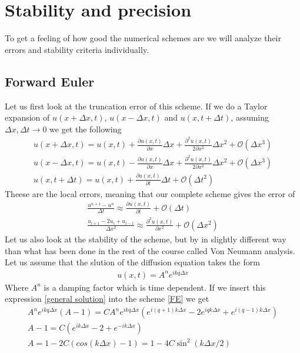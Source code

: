 \documentclass[a4paper,english, 10pt, twoside]{article}
\begin{document}
\section{Stability and precision}\label{stability}
To get a feeling of how good the numerical schemes are we will analyze their errors and stability criteria individually.
\subsection{Forward Euler}
Let us first look at the truncation error of this scheme. If we do a Taylor expansion of $u(x+\Delta x,t)$, $u(x-\Delta x,t)$ 
and $u(x,t+\Delta t)$, assuming $\Delta x,\Delta t \to 0$ we get the following
\begin{align*}
 u(x+\Delta x,t) = u(x,t) + \frac{\partial u(x,t)}{\partial x}\Delta x +\frac{\partial^2u(x,t)}{2\partial x^2}\Delta x^2 
 +\mathcal{O}(\Delta x^3)\\
 u(x-\Delta x,t) = u(x,t) - \frac{\partial u(x,t)}{\partial x}\Delta x +\frac{\partial^2u(x,t)}{2\partial x^2}\Delta x^2 
 +\mathcal{O}(\Delta x^3) \\
  u(x,t+\Delta t) = u(x,t) + \frac{\partial u(x,t)}{\partial t}\Delta t +\mathcal{O}(\Delta t^2)
 \end{align*}
Theese are the local errors, meaning that our complete scheme gives the error of 
\begin{align*}
 \frac{u^{n+1}-u^n}{\Delta t} \approx \frac{\partial u(x,t)}{\partial t} +\mathcal{O}(\Delta t)\\
 \frac{u_{i+1}-2u_i +u_{i-1}}{\Delta x^2} \approx \frac{\partial^2 u(x,t)}{\partial x^2} +\mathcal{O}(\Delta x^2)
\end{align*}
Let us also look at the stability of the scheme, but by in slightly different way than what has been done in the rest of the 
course called Von Neumann analysis. Let us assume that the slution of the diffusion equation takes the form
\begin{align}\label{general solution}
 u(x,t) = A^ne^{ikq\Delta x}
\end{align}
Where $A^n$ is a damping factor which is time dependent. If we insert this expression \ref{general solution} into the scheme 
\ref{FE} we get
\begin{align*}
 A^ne^{ikq\Delta x}(A-1) = CA^ne^{ikq\Delta x}(e^{i(q+1)k\Delta x}-2e^{iqk\Delta x} +e^{i(q-1)k \Delta x})\\
 A-1 = C(e^{ik\Delta x}-2+e^{-ik \Delta x})\\
 A = 1 - 2C(cos(k\Delta x)-1) = 1 -4C\sin^2(k\Delta x/2)
\end{align*}
\end{document}
